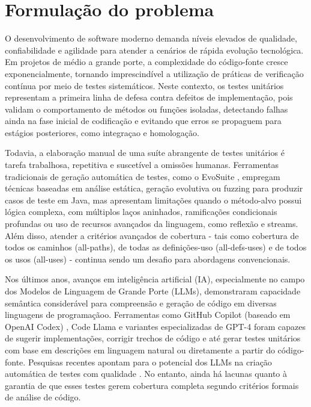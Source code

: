 \section{Formulação do problema}
O desenvolvimento de software moderno demanda níveis elevados de qualidade, confiabilidade e agilidade para atender a cenários de rápida evolução tecnológica. Em projetos de médio a grande porte, a complexidade do código-fonte cresce exponencialmente, tornando imprescindível a utilização de práticas de verificação contínua por meio de testes sistemáticos. Neste contexto, os testes unitários representam a primeira linha de defesa contra defeitos de implementação, pois validam o comportamento de métodos ou funções isoladas, detectando falhas ainda na fase inicial de codificação e evitando que erros se propaguem para estágios posteriores, como integraçao e homologação.

Todavia, a elaboração manual de uma suíte abrangente de testes unitários é tarefa trabalhosa, repetitiva e suscetível a omissões humanas. Ferramentas tradicionais de geração automática de testes, como o EvoSuite \cite{fraser2011evosuite}, empregam técnicas baseadas em análise estática, geração evolutiva ou fuzzing para produzir casos de teste em Java, mas apresentam limitações quando o método-alvo possui lógica complexa, com múltiplos laços aninhados, ramificações condicionais profundas ou uso de recursos avançados da linguagem, como reflexão e streams. Além disso, atender a critérios avançados de cobertura - tais como cobertura de todos os caminhos (all-paths), de todas as definições-uso (all-defs-uses) e de todos os usos (all-uses) - continua sendo um desafio para abordagens convencionais.

Nos últimos anos, avanços em inteligência artificial (IA), especialmente no campo dos Modelos de Linguagem de Grande Porte (LLMs), demonstraram capacidade semântica considerável para compreensão e geração de código em diversas linguagens de programaçãoo. Ferramentas como GitHub Copilot (baseado em OpenAI Codex) \cite{openai2023gpt4}, Code Llama e variantes especializadas de GPT-4 foram capazes de sugerir implementações, corrigir trechos de código e até gerar testes unitários com base em descrições em linguagem natural ou diretamente a partir do código-fonte. Pesquisas recentes apontam para o potencial dos LLMs na criação automática de testes com qualidade \cite{chen2023chatunitest, moradidakhel2023effective, steenhoek2024reinforcement, gu2024testART}. No entanto, ainda há lacunas quanto à garantia de que esses testes gerem cobertura completa segundo critérios formais de análise de código.